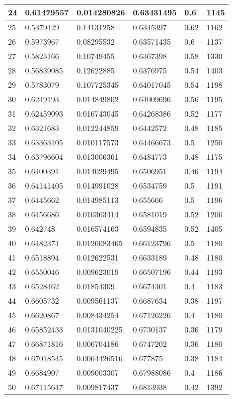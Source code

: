 \begin{longtable}{|l|l|l|l|l|l|}
24 & 0.61479557 & 0.014280826 & 0.63431495 & 0.6 & 1145 \\ \hline 
25 & 0.5379429 & 0.14131258 & 0.6345397 & 0.62 & 1162 \\ \hline 
26 & 0.5973967 & 0.08295532 & 0.63571435 & 0.6 & 1137 \\ \hline 
27 & 0.5823166 & 0.10749455 & 0.6367398 & 0.58 & 1330 \\ \hline 
28 & 0.56839085 & 0.12622885 & 0.6376975 & 0.54 & 1403 \\ \hline 
29 & 0.5783079 & 0.107725345 & 0.64017045 & 0.54 & 1198 \\ \hline 
30 & 0.6249193 & 0.014849802 & 0.64009696 & 0.56 & 1195 \\ \hline 
31 & 0.62459093 & 0.016743045 & 0.64268386 & 0.52 & 1177 \\ \hline 
32 & 0.6321683 & 0.012244859 & 0.6442572 & 0.48 & 1185 \\ \hline 
33 & 0.63363105 & 0.010117573 & 0.64466673 & 0.5 & 1250 \\ \hline 
34 & 0.63796604 & 0.013006361 & 0.6484773 & 0.48 & 1175 \\ \hline 
35 & 0.6400391 & 0.014029495 & 0.6506951 & 0.46 & 1194 \\ \hline 
36 & 0.64141405 & 0.014991028 & 0.6534759 & 0.5 & 1191 \\ \hline 
37 & 0.6445662 & 0.014985113 & 0.655666 & 0.5 & 1196 \\ \hline 
38 & 0.6456686 & 0.010363414 & 0.6581019 & 0.52 & 1206 \\ \hline 
39 & 0.642748 & 0.016574163 & 0.6594835 & 0.52 & 1405 \\ \hline 
40 & 0.6482374 & 0.0126083465 & 0.66123796 & 0.5 & 1180 \\ \hline 
41 & 0.6518894 & 0.012622531 & 0.6633189 & 0.48 & 1180 \\ \hline 
42 & 0.6550046 & 0.009623019 & 0.66507196 & 0.44 & 1193 \\ \hline 
43 & 0.6528462 & 0.01854309 & 0.6674301 & 0.4 & 1183 \\ \hline 
44 & 0.6605732 & 0.009561137 & 0.6687634 & 0.38 & 1197 \\ \hline 
45 & 0.6620867 & 0.008434254 & 0.67126226 & 0.4 & 1180 \\ \hline 
46 & 0.65852433 & 0.0131040225 & 0.6730137 & 0.36 & 1179 \\ \hline 
47 & 0.66871816 & 0.006704186 & 0.6747202 & 0.36 & 1180 \\ \hline 
48 & 0.67018545 & 0.0064426516 & 0.677875 & 0.38 & 1184 \\ \hline 
49 & 0.6684907 & 0.009003307 & 0.67988086 & 0.4 & 1186 \\ \hline 
50 & 0.67115647 & 0.009817437 & 0.6813938 & 0.42 & 1392 \\ \hline 
\end{longtable}